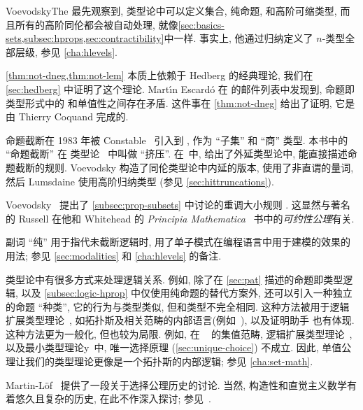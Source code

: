 VoevodskyThe 最先观察到, 类型论中可以定义集合, 纯命题, 和高阶可缩类型, 而且所有的高阶同伦都会被自动处理, 就像\cref{sec:basics-sets,subsec:hprops,sec:contractibility}中一样.
事实上, 他通过归纳定义了 $n$-类型全部层级, 参见 \cref{cha:hlevels}.%

\cref{thm:not-dneg,thm:not-lem} 本质上依赖于 Hedberg 的经典理论,
%
%
我们在 \cref{sec:hedberg} 中证明了这个理论.
Mart\'\i n Escard\'o 在 \Agda 的邮件列表中发现到, 命题即类型形式中的 \LEM{} 和单值性之间存在矛盾.
这件事在 \cref{thm:not-dneg} 给出了证明, 它是由 Thierry Coquand 完成的.

命题截断在 1983 年被 Constable~\cite{Con85} 引入到 , 作为 ``子集'' 和 ``商'' 类型.
本书中的 ``命题截断'' 在 \NuPRL 类型论~\cite{constable+86nuprl-book} 中叫做 ``挤压''.
在~\cite{ab:bracket-types}中, 给出了外延类型论中, 能直接描述命题截断的规则.
Voevodsky 构造了同伦类型论中内延的版本, 使用了非直谓的量词, 然后 Lumsdaine 使用高阶归纳类型 (参见 \cref{sec:hittruncations}).

%
Voevodsky~\cite{Universe-poly} 提出了 \cref{subsec:prop-subsets} 中讨论的重调大小规则 .
%
这显然与著名的 Russell 在他和 Whitehead 的 \emph{Principia Mathematica}~\cite{PM2} 书中的\emph{可约性公理}有关.

副词 ``纯'' 用于指代未截断逻辑时, 用了单子模式在编程语言中用于建模的效果的用法;
参见 \cref{sec:modalities} 和 \cref{cha:hlevels} 的备注.

类型论中有很多方式来处理逻辑关系.
例如, 除了在 \cref{sec:pat} 描述的命题即类型逻辑, 以及 \cref{subsec:logic-hprop} 中仅使用纯命题的替代方案外, 还可以引入一种独立的命题 ``种类'', 它的行为与类型类似, 但和类型不完全相同.
这种方法被用于逻辑扩展类型理论~\cite{aczel2002collection}, 如拓扑斯及相关范畴的内部语言(例如~\cite{jacobs1999categorical,elephant}), 以及证明助手 \Coq 也有体现.
这种方法更为一般化, 但也较为局限.
例如, 在 \Coq~\cite{Spiwack} 的集值范畴, 逻辑扩展类型理论~\cite{aczel2002collection}, 以及最小类型理论y~\cite{maietti2005toward}中, 唯一选择原理 (\cref{sec:unique-choice}) 不成立.
因此, 单值公理让我们的类型理论更像是一个拓扑斯的内部逻辑;
参见 \cref{cha:set-math}.

Martin-L\"of~\cite{martin2006100} 提供了一段关于选择公理历史的讨论.
当然, 构造性和直觉主义数学有着悠久且复杂的历史, 在此不作深入探讨;
参见~\cite{TroelstraI,TroelstraII}.
